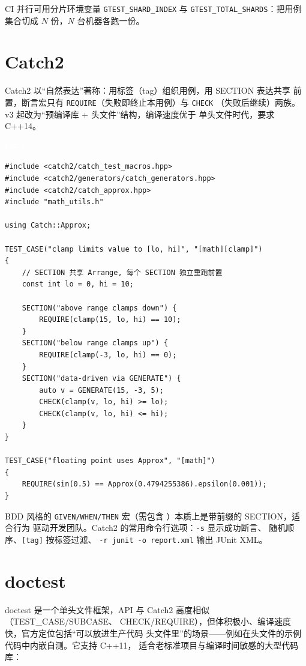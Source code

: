 \documentclass[12pt,a4paper,fontset=fandol]{ctexbook}
\newcommand{\cpplabel}{%
  \begin{tcolorbox}[enhanced,colback=cppheadbg,colframe=cppheadbg,
    arc=1mm,boxrule=0mm,left=6pt,right=6pt,top=2pt,bottom=2pt,
    halign=left,oversize]
    \textcolor{white}{\small\bfseries C++}
  \end{tcolorbox}\vspace{-4pt}}
\begin{document}
\begin{note}
CI 并行可用分片环境变量 \texttt{GTEST\_SHARD\_INDEX} 与
\texttt{GTEST\_TOTAL\_SHARDS}：把用例集合切成 $N$ 份，$N$ 台机器各跑一份。
\end{note}

\section{Catch2}

Catch2 以“自然表达”著称：用标签（tag）组织用例，用 SECTION 表达共享
前置，断言宏只有 \texttt{REQUIRE}（失败即终止本用例）与 \texttt{CHECK}
（失败后继续）两族。v3 起改为“预编译库 + 头文件”结构，编译速度优于
单头文件时代，要求 C++14。

\cpplabel
\begin{lstlisting}
#include <catch2/catch_test_macros.hpp>
#include <catch2/generators/catch_generators.hpp>
#include <catch2/catch_approx.hpp>
#include "math_utils.h"

using Catch::Approx;

TEST_CASE("clamp limits value to [lo, hi]", "[math][clamp]")
{
    // SECTION 共享 Arrange, 每个 SECTION 独立重跑前置
    const int lo = 0, hi = 10;

    SECTION("above range clamps down") {
        REQUIRE(clamp(15, lo, hi) == 10);
    }
    SECTION("below range clamps up") {
        REQUIRE(clamp(-3, lo, hi) == 0);
    }
    SECTION("data-driven via GENERATE") {
        auto v = GENERATE(15, -3, 5);
        CHECK(clamp(v, lo, hi) >= lo);
        CHECK(clamp(v, lo, hi) <= hi);
    }
}

TEST_CASE("floating point uses Approx", "[math]")
{
    REQUIRE(sin(0.5) == Approx(0.4794255386).epsilon(0.001));
}
\end{lstlisting}

BDD 风格的 \texttt{GIVEN/WHEN/THEN} 宏（需包含
）本质上是带前缀的 SECTION，适合行为
驱动开发团队。Catch2 的常用命令行选项：\texttt{-s} 显示成功断言、
 随机顺序、\texttt{[tag]} 按标签过滤、
\texttt{-r junit -o report.xml} 输出 JUnit XML。

\section{doctest}

doctest 是一个单头文件框架，API 与 Catch2 高度相似（TEST\_CASE/SUBCASE、
CHECK/REQUIRE），但体积极小、编译速度快，官方定位包括“可以放进生产代码
头文件里”的场景——例如在头文件的示例代码中内嵌自测。它支持 C++11，
适合老标准项目与编译时间敏感的大型代码库：
\end{document}
